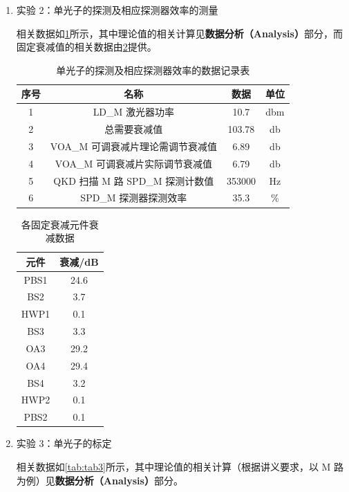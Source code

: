\begin{enumerate}
	
	\item 实验 2：单光子的探测及相应探测器效率的测量
	
	相关数据如\cref{tab:tab2-1}所示，其中理论值的相关计算见\textbf{数据分析（Analysis）}部分，而固定衰减值的相关数据由\cref{tab:tab2-2}提供。
	
	\begin{table}[htbp]
		\centering
		\begin{tabular}{|c|c|c|c|}
			\hline
			序号 & 名称 & 数据 & 单位 \\
			\hline
			1 & LD\_M 激光器功率 & 10.7 & dbm \\
			2 & 总需要衰减值 & 103.78 & db \\
			3 & VOA\_M 可调衰减片理论需调节衰减值 & 6.89 & db \\
			4 & VOA\_M 可调衰减片实际调节衰减值 & 6.79 & db \\
			5 & QKD 扫描 M 路 SPD\_M 探测计数值 & 353000 & Hz \\
			6 & SPD\_M 探测器探测效率 & 35.3 & \% \\
			\hline
		\end{tabular}
		\caption{单光子的探测及相应探测器效率的数据记录表}
		\label{tab:tab2-1}
	\end{table}
	
	\begin{table}[htbp]
		\centering
		\begin{tabular}{|c|c|}
			\hline
			元件 & 衰减/dB \\
			\hline
			PBS1 & 24.6 \\
			BS2  & 3.7  \\
			HWP1 & 0.1  \\
			BS3  & 3.3  \\
			OA3  & 29.2 \\
			OA4  & 29.4 \\
			BS4  & 3.2  \\
			HWP2 & 0.1  \\
			PBS2 & 0.1  \\
			\hline
		\end{tabular}
		\caption{各固定衰减元件衰减数据}
		\label{tab:tab2-2}
	\end{table}
	
	\item 实验 3：单光子的标定
	
	相关数据如\cref{tab:tab3}所示，其中理论值的相关计算（根据讲义要求，以 M 路为例）见\textbf{数据分析（Analysis）}部分。
	

\end{enumerate}
